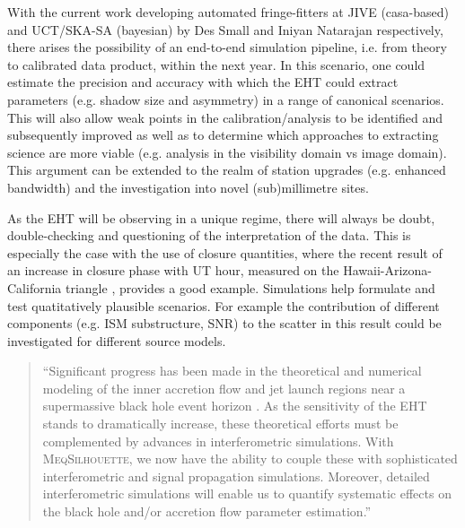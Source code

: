 With the current work developing automated fringe-fitters at JIVE (casa-based) and UCT/SKA-SA (bayesian) by Des Small and Iniyan Natarajan respectively, there arises the possibility of an end-to-end simulation pipeline, i.e. from theory to calibrated data product, within the next year. In this scenario, one could estimate the precision and accuracy with which the EHT could extract parameters (e.g. shadow size and asymmetry) in a range of canonical scenarios. This will also allow weak points in the calibration/analysis to be identified and subsequently improved as well as to determine which approaches to extracting science are more viable (e.g. analysis in the visibility domain vs image domain).
This argument can be extended to the realm of station upgrades (e.g. enhanced bandwidth) and the investigation into novel (sub)millimetre sites. 


As the EHT will be observing in a unique regime, there will always be doubt, double-checking and questioning of the interpretation of the data. This is especially the case with the use of closure quantities, where the recent result of an increase in closure phase with UT hour, measured on the Hawaii-Arizona-California triangle \citep{Fish_2016}, provides a good example. Simulations help formulate and test quatitatively plausible scenarios. For example the contribution of different components (e.g. ISM substructure, SNR) to the scatter in this result could be investigated for different source models. 

\begin{quotation}
``Significant progress has been made in the theoretical and numerical modeling of the inner accretion flow and jet launch regions near a supermassive black hole event horizon
\citep[e.g.][]{Zanna_2007,Etienne_2010,Dexter_2013,Moscibrodzka_2014, McKinney_2014}. As the sensitivity of the EHT stands to dramatically increase, these theoretical efforts must be complemented by advances in interferometric simulations. With \textsc{MeqSilhouette}, we now have the ability to couple these with sophisticated interferometric and signal propagation simulations.  Moreover, detailed interferometric simulations will enable us to quantify systematic effects on the black hole and/or accretion flow parameter estimation.''\\
\citep{Blecher_2016}
\end{quotation}



